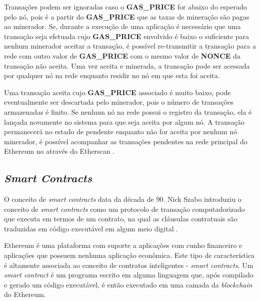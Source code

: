 \documentclass[tcc,capa]{texufpel}
\begin{document}
	Transações podem ser ignoradas caso o \textbf{GAS\_PRICE} for abaixo do esperado pelo nó, pois é a partir do \textbf{GAS\_PRICE} que as taxas de mineração são pagas ao minerador. Se, durante a execução de uma aplicação é necessário que uma transação seja efetuada cujo \textbf{GAS\_PRICE} envolvido é baixo o suficiente para nenhum minerador aceitar a transação, é possível re-transmitir a transação para a rede com outro valor de \textbf{GAS\_PRICE} com o mesmo valor de \textbf{NONCE} da transação não aceita. Uma vez aceita e minerada, a transação pode ser acessada por qualquer nó na rede enquanto residir no nó em que esta foi aceita.
	
	Uma transação aceita cujo \textbf{GAS\_PRICE} associado é muito baixo, pode eventualmente ser descartada pelo minerador, pois o número de transações armazenadas é finito. Se nenhum nó na rede possui o registro da transação, ela é lançada novamente no sistema para que seja aceita por algum nó. A transação permanecerá no estado de pendente enquanto não for aceita por nenhum nó minerador, é possível acompanhar as transações pendentes na rede principal do Ethereum no através do Etherscan \cite{team2017etherscan}.

	
	
	
	\subsection{\textit{Smart Contracts}}
	
	O conceito de \textit{smart contracts} data da década de 90. Nick Szabo introduziu o conceito de \textit{smart contracts} como um protocolo de transação computadorizado que executa em termos de um contrato, na qual as cláusulas contratuais são traduzidas em código executável em algum meio digital \cite{szabo1997}.
	
	Ethereum é uma plataforma com suporte a aplicações com cunho financeiro e aplicações que possuem nenhuma aplicação econômica. Este tipo de característica é altamente associada ao conceito de contratos inteligentes - \textit{smart contracts}. Um \textit{smart contract} é um programa escrito em alguma linguagem que, após compilado e gerado um código executável, é então executado em uma camada da \textit{blockchain} do Ethereum.
	
\end{document}
